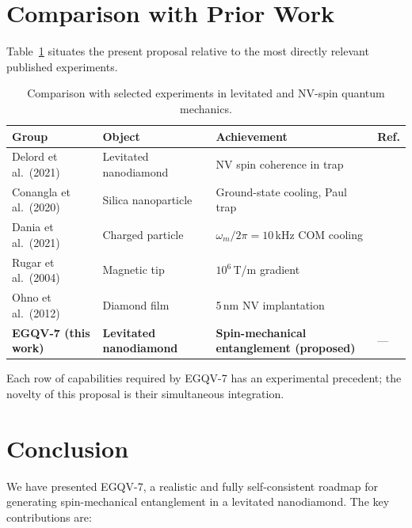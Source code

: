 \documentclass[12pt,a4paper]{article}
\begin{document}
\section{Comparison with Prior Work}
\label{sec:comparison}

Table~\ref{tab:comparison} situates the present proposal relative to the most
directly relevant published experiments.

\begin{table}[h]
\centering
\caption{Comparison with selected experiments in levitated and NV-spin
         quantum mechanics.}
\label{tab:comparison}
\begin{tabular}{@{}llll@{}}
\toprule
Group & Object & Achievement & Ref. \\
\midrule
Delord et al.\ (2021) & Levitated nanodiamond & NV spin coherence in trap & \cite{Delord2021} \\
Conangla et al.\ (2020) & Silica nanoparticle & Ground-state cooling, Paul trap & \cite{Conangla2020} \\
Dania et al.\ (2021) & Charged particle & $\omega_m/2\pi = 10$\,kHz COM cooling & \cite{Dania2021} \\
Rugar et al.\ (2004) & Magnetic tip & $10^6$\,T/m gradient & \cite{Rugar2004} \\
Ohno et al.\ (2012) & Diamond film & 5\,nm NV implantation & \cite{Ohno2012} \\
\midrule
\textbf{EGQV-7 (this work)} & \textbf{Levitated nanodiamond} & \textbf{Spin-mechanical entanglement (proposed)} & --- \\
\bottomrule
\end{tabular}
\end{table}

Each row of capabilities required by EGQV-7 has an experimental precedent; the
novelty of this proposal is their simultaneous integration.

\section{Conclusion}
\label{sec:conclusion}

We have presented EGQV-7, a realistic and fully self-consistent roadmap for
generating spin-mechanical entanglement in a levitated nanodiamond. The key
contributions are:
\end{document}
